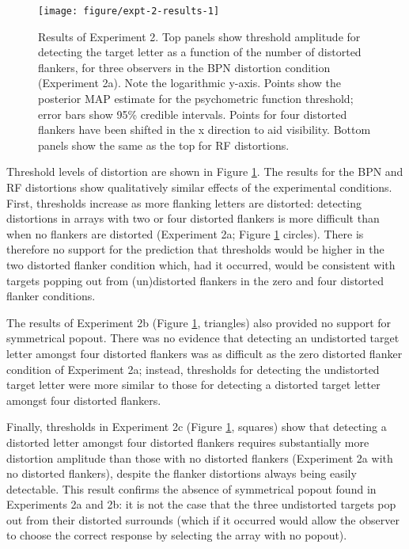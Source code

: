 \documentclass[doc, 11pt,a4paper,natbib]{apa6}\usepackage[]{graphicx}\usepackage[]{color}
\newenvironment{knitrout}{}{} %
\begin{document}
\begin{knitrout}
\color{fgcolor}\begin{figure}
\texttt{[image: figure/expt-2-results-1]} \caption[Results of Experiment 2]{Results of Experiment 2.
	Top panels show threshold amplitude for detecting the target letter as a function of the number of distorted flankers, for three observers in the BPN distortion condition (Experiment 2a).
	Note the logarithmic y-axis.
	Points show the posterior MAP estimate for the psychometric function threshold; error bars show 95\% credible intervals.
	Points for four distorted flankers have been shifted in the x direction to aid visibility.
  Bottom panels show the same as the top for RF distortions.
}\label{fig:expt-2-results}
\end{figure}


\end{knitrout}

Threshold levels of distortion are shown in Figure \ref{fig:expt-2-results}.
The results for the BPN and RF distortions show qualitatively similar effects of the experimental conditions.
First, thresholds increase as more flanking letters are distorted: detecting distortions in arrays with two or four distorted flankers is more difficult than when no flankers are distorted (Experiment 2a; Figure \ref{fig:expt-2-results} circles).
There is therefore no support for the prediction that thresholds would be higher in the two distorted flanker condition which, had it occurred, would be consistent with targets popping out from (un)distorted flankers in the zero and four distorted flanker conditions.

The results of Experiment 2b (Figure \ref{fig:expt-2-results}, triangles) also provided no support for symmetrical popout.
There was no evidence that detecting an undistorted target letter amongst four distorted flankers was as difficult as the zero distorted flanker condition of Experiment 2a; instead, thresholds for detecting the undistorted target letter were more similar to those for detecting a distorted target letter amongst four distorted flankers.

Finally, thresholds in Experiment 2c (Figure \ref{fig:expt-2-results}, squares) show that detecting a distorted letter amongst four distorted flankers requires substantially more distortion amplitude than those with no distorted flankers (Experiment 2a with no distorted flankers), despite the flanker distortions always being easily detectable.
This result confirms the absence of symmetrical popout found in Experiments 2a and 2b: it is not the case that the three undistorted targets pop out from their distorted surrounds (which if it occurred would allow the observer to choose the correct response by selecting the array with no popout).
\end{document}
